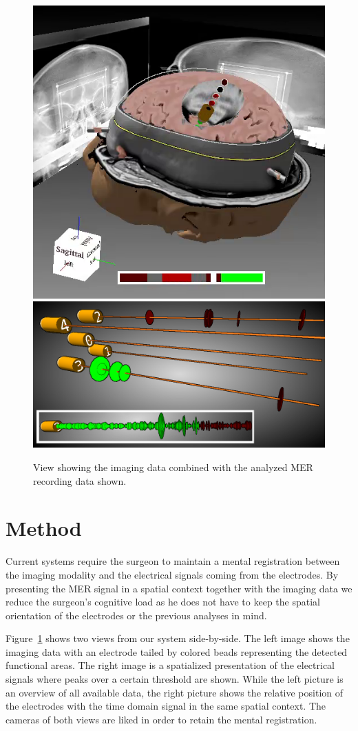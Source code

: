 \documentclass{egpubl}
\begin{document}
\begin{figure}[t]
\centering
\includegraphics[width=0.495\linewidth]{verification-3d.png}
\includegraphics[width=0.495\linewidth, height=0.495\linewidth]{recording-3dsound.png}
\caption{View showing the imaging data combined with the analyzed MER recording data shown.}
\label{figure1}
\end{figure}


\section{Method}
Current systems require the surgeon to maintain a mental registration between the imaging modality and the electrical signals coming from the electrodes. By presenting the MER signal in a spatial context together with the imaging data we reduce the surgeon's cognitive load as he does not have to keep the spatial orientation of the electrodes or the previous analyses in mind.

Figure~\ref{figure1} shows two views from our system side-by-side. The left image shows the imaging data with an electrode tailed by colored beads representing the detected functional areas. The right image is a spatialized presentation of the electrical signals where peaks over a certain threshold are shown. While the left picture is an overview of all available data, the right picture shows the relative position of the electrodes with the time domain signal in the same spatial context. The cameras of both views are liked in order to retain the mental registration.
\end{document}
